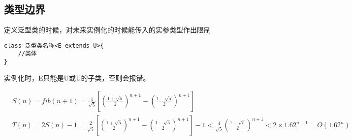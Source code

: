 \documentclass[a4paper]{report}
\begin{document}
\subsection{类型边界}
定义泛型类的时候，对未来实例化的时候能传入的实参类型作出限制

\begin{lstlisting}
class 泛型类名称<E extends U>{
    //类体
}
\end{lstlisting}

实例化时，E只能是U或U的子类，否则会报错。
\newpage





\begin{align*}
&S(n) = fib(n+1) = \frac{1}{\sqrt{5}}\left[\left(\frac{1+\sqrt{5}}{2}\right)^{n+1}-\left(\frac{1-\sqrt{5}}{2}\right)^{n+1}\right]\\
&T(n)=2S(n) - 1=\frac{2}{\sqrt{5}}\left[\left(\frac{1+\sqrt{5}}{2}\right)^{n+1}-\left(\frac{1-\sqrt{5}}{2}\right)^{n+1}\right]-1<\frac{4}{\sqrt{5}}\left(\frac{1+\sqrt{5}}{2}\right)^{n+1}<2\times1.62^{n+1}=O(1.62^n)
\end{align*}
\end{document}
